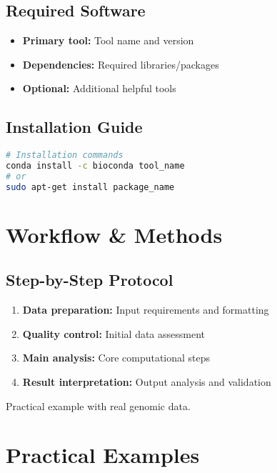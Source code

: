 \documentclass[a4paper,11pt]{article}
\begin{document}
\subsection{Required Software}

\begin{itemize}
    \item \textbf{Primary tool:} Tool name and version
    \item \textbf{Dependencies:} Required libraries/packages
    \item \textbf{Optional:} Additional helpful tools
\end{itemize}

\subsection{Installation Guide}
\begin{lstlisting}[language=bash, caption=Software installation]
# Installation commands
conda install -c bioconda tool_name
# or
sudo apt-get install package_name
\end{lstlisting}

\section{Workflow \& Methods}

\subsection{Step-by-Step Protocol}

\begin{enumerate}
    \item \textbf{Data preparation:} Input requirements and formatting
    \item \textbf{Quality control:} Initial data assessment
    \item \textbf{Main analysis:} Core computational steps
    \item \textbf{Result interpretation:} Output analysis and validation
\end{enumerate}

\begin{example}
Practical example with real genomic data.
\end{example}

\section{Practical Examples}
\end{document}
